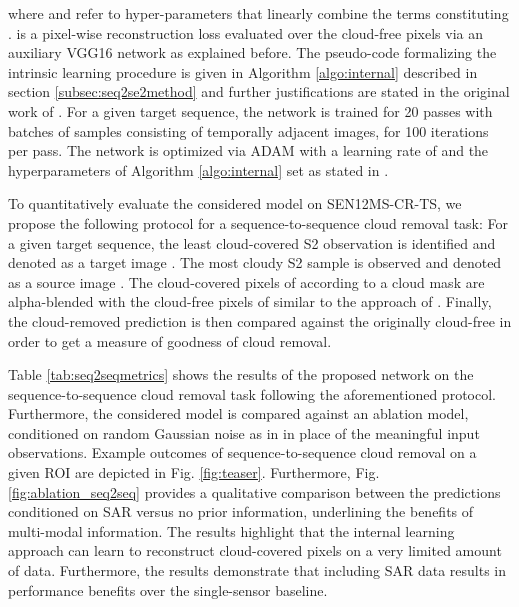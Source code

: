 \documentclass[journal]{IEEEtran}
\begin{document}
\label{eq:Lall_seq2seq}






where  and  refer to hyper-parameters that linearly combine the terms constituting .  is a pixel-wise reconstruction loss evaluated over the cloud-free pixels via an auxiliary VGG16 network \cite{Simonyan_Zisserman_2014} as explained before. The pseudo-code formalizing the intrinsic learning procedure is given in Algorithm \ref{algo:internal} described in section \ref{subsec:seq2se2method} and further justifications are stated in the original work of \cite{ulyanov2018deep}. For a given target sequence, the network is trained for 20 passes with batches of  samples consisting of temporally adjacent images, for 100 iterations per pass. The network is optimized via ADAM \cite{kingma2014adam} with a learning rate of   and the hyperparameters of Algorithm \ref{algo:internal} set as stated in \cite{zhang2019internal}.

To quantitatively evaluate the considered model on SEN12MS-CR-TS, we propose the following protocol for a sequence-to-sequence cloud removal task:
For a given target sequence, the least cloud-covered S2 observation is identified and denoted as a target image . The most cloudy S2 sample is observed and denoted as a source image . The cloud-covered pixels of  according to a cloud mask  are alpha-blended with the cloud-free pixels of  similar to the approach of \cite{Rafique_Blanton_Jacobs}. Finally, the cloud-removed prediction  is then compared against the originally cloud-free  in order to get a measure of goodness of cloud removal.

Table \ref{tab:seq2seqmetrics} shows the results of the proposed network on the sequence-to-sequence cloud removal task following the aforementioned protocol. Furthermore, the considered model is compared against an ablation model, conditioned on random Gaussian noise as in \cite{ulyanov2018deep, zhang2019internal} in place of the meaningful  input observations. Example outcomes of sequence-to-sequence cloud removal on a given ROI are depicted in Fig. \ref{fig:teaser}. Furthermore, Fig. \ref{fig:ablation_seq2seq} provides a qualitative comparison between the predictions conditioned on SAR versus no prior information, underlining the benefits of multi-modal information. The results highlight that the internal learning approach can learn to reconstruct cloud-covered pixels on a very limited amount of data. Furthermore, the results demonstrate that including SAR data results in performance benefits over the single-sensor baseline.
\end{document}
